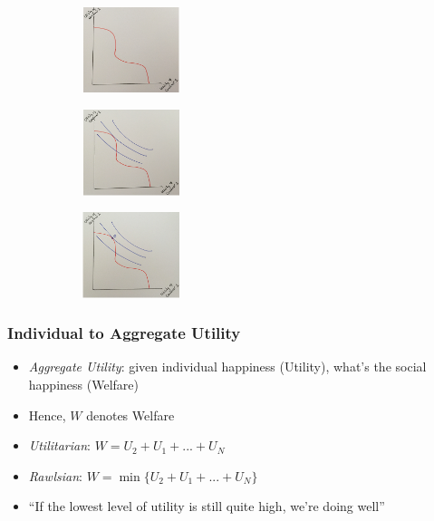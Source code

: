 \documentclass[11pt, english]{article}
\begin{document}
	\begin{figure}[H]
	\begin{center}
		\begin{subfigure}[t]{4cm}  
                \begin{center}
                        \includegraphics[width=3cm,height=2.5cm]{EC315-IMG/28.png}        
                \end{center}
                \end{subfigure}      
                \begin{subfigure}[t]{4cm}  
                \begin{center}
                        \includegraphics[width=3cm,height=2.5cm]{EC315-IMG/29.png}        
                \end{center}
                \end{subfigure}
                \begin{subfigure}[t]{4cm}  
                \begin{center}
                        \includegraphics[width=3cm,height=2.5cm]{EC315-IMG/30.png}      
                \end{center}
                \end{subfigure}
	\end{center}
	\end{figure}

		\subsubsection{Individual to Aggregate Utility}

	\begin{itemize}
	\setlength\itemsep{0cm}
		\item \textit{Aggregate Utility}: given individual happiness (Utility), what’s the social happiness (Welfare)
		\item Hence, $W$ denotes Welfare
		\item \textit{Utilitarian}: $W=U_2+U_1+...+U_N$
		\item \textit{Rawlsian}: $W=\min\{U_2+U_1+...+U_N\}$
		\item ``If the lowest level of utility is still quite high, we're doing well''
	\end{itemize}
\end{document}

